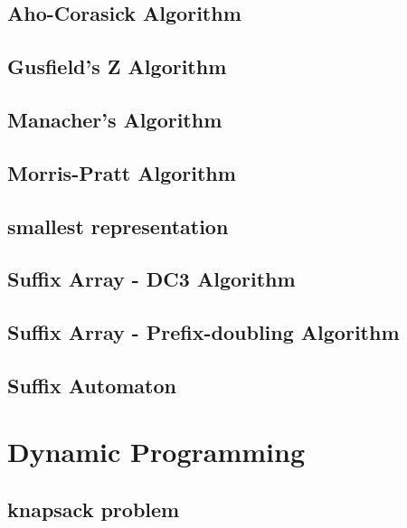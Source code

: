 \documentclass[a4paper,5pt,twocolumn,titlepage]{article}
\begin{document}
\subsection{Aho-Corasick Algorithm}

\subsection{Gusfield's Z Algorithm}

\subsection{Manacher's Algorithm}

\subsection{Morris-Pratt Algorithm}

\subsection{smallest representation}

\subsection{Suffix Array - DC3 Algorithm}

\subsection{Suffix Array - Prefix-doubling Algorithm}

\subsection{Suffix Automaton}


\section{Dynamic Programming}
\subsection{knapsack problem}

\end{document}
